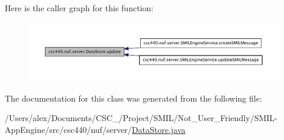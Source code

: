 Here is the caller graph for this function\-:
\nopagebreak
\begin{figure}[H]
\begin{center}
\leavevmode
\includegraphics[width=350pt]{classcsc440_1_1nuf_1_1server_1_1_data_store_ab66ed1adeb1a5ee0ce37bf5404909e11_icgraph}
\end{center}
\end{figure}




The documentation for this class was generated from the following file\-:\begin{DoxyCompactItemize}
\item 
/\-Users/alex/\-Documents/\-C\-S\-C\-\_/\-Project/\-S\-M\-I\-L/\-Not\-\_\-\-User\-\_\-\-Friendly/\-S\-M\-I\-L-\/\-App\-Engine/src/csc440/nuf/server/\hyperlink{_data_store_8java}{Data\-Store.\-java}\end{DoxyCompactItemize}

